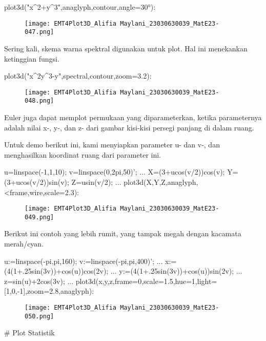 \documentclass{article}
\begin{document}
\> plot3d("x^2+y^3",\>anaglyph,\>contour,angle=30°):


\begin{figure}
    \centering
    \texttt{[image: EMT4Plot3D\_Alifia Maylani\_23030630039\_MatE23-047.png]}
    \caption{}
    \label{fig:enter-label}
\end{figure}

Sering kali, skema warna spektral digunakan untuk plot. Hal ini
menekankan ketinggian fungsi.


\> plot3d("x^2\*y^3-y",\>spectral,\>contour,zoom=3.2):


\begin{figure}
    \centering
    \texttt{[image: EMT4Plot3D\_Alifia Maylani\_23030630039\_MatE23-048.png]}
    \caption{}
    \label{fig:enter-label}
\end{figure}

Euler juga dapat memplot permukaan yang diparameterkan, ketika
parameternya adalah nilai x-, y-, dan z- dari gambar kisi-kisi persegi
panjang di dalam ruang.


Untuk demo berikut ini, kami menyiapkan parameter u- dan v-, dan
menghasilkan koordinat ruang dari parameter ini.


\>u=linspace(-1,1,10); v=linspace(0,2\*pi,50)'; ...  
\>   X=(3+u\*cos(v/2))\*cos(v); Y=(3+u\*cos(v/2))\*sin(v); Z=u\*sin(v/2); ...  
\>   plot3d(X,Y,Z,\>anaglyph,<frame,\>wire,scale=2.3):


\begin{figure}
    \centering
    \texttt{[image: EMT4Plot3D\_Alifia Maylani\_23030630039\_MatE23-049.png]}
    \caption{}
    \label{fig:enter-label}
\end{figure}

Berikut ini contoh yang lebih rumit, yang tampak megah dengan kacamata
merah/cyan.


\>u:=linspace(-pi,pi,160); v:=linspace(-pi,pi,400)';  ...  
\>   x:=(4\*(1+.25\*sin(3\*v))+cos(u))\*cos(2\*v); ...  
\>   y:=(4\*(1+.25\*sin(3\*v))+cos(u))\*sin(2\*v); ...  
\>    z=sin(u)+2\*cos(3\*v); ...  
\>   plot3d(x,y,z,frame=0,scale=1.5,hue=1,light=[1,0,-1],zoom=2.8,\>anaglyph):


\begin{figure}
    \centering
    \texttt{[image: EMT4Plot3D\_Alifia Maylani\_23030630039\_MatE23-050.png]}
    \caption{}
    \label{fig:enter-label}
\end{figure}

# Plot Statistik
\end{document}
